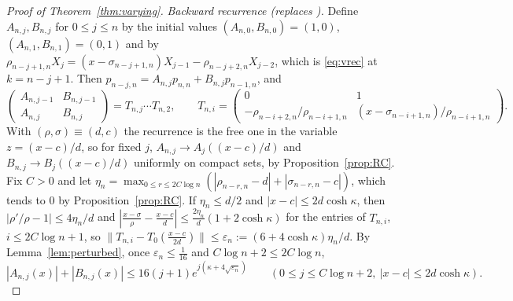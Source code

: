 \documentclass[11pt]{amsart}
\theoremstyle{definition}
\theoremstyle{remark}
\numberwithin{equation}{section}
\newcommand{\eps}{\varepsilon}
\begin{document}
\begin{proof}[Proof of Theorem~\ref{thm:varying}]
\emph{Backward recurrence (replaces \cite[Lemmas~{\ref{M-lem:continuant}}--{\ref{M-lem:transfer}}]{Main}).} Define $A_{n,j},B_{n,j}$ for $0\le j\le n$ by the initial values $(A_{n,0},B_{n,0})=(1,0)$, $(A_{n,1},B_{n,1})=(0,1)$ and by $\rho_{n-j+1,n}X_j=(x-\sigma_{n-j+1,n})X_{j-1}-\rho_{n-j+2,n}X_{j-2}$, which is \eqref{eq:vrec} at $k=n-j+1$. Then $p_{n-j,n}=A_{n,j}p_{n,n}+B_{n,j}p_{n-1,n}$, and
\[
\begin{pmatrix}A_{n,j-1}&B_{n,j-1}\\A_{n,j}&B_{n,j}\end{pmatrix}=T_{n,j}\cdots T_{n,2},\qquad T_{n,i}=\begin{pmatrix}0&1\\-\rho_{n-i+2,n}/\rho_{n-i+1,n}&(x-\sigma_{n-i+1,n})/\rho_{n-i+1,n}\end{pmatrix}.
\] With $(\rho,\sigma)\equiv(d,c)$ the recurrence is the free one in the variable $z=(x-c)/d$, so for fixed $j$, $A_{n,j}\to A_j((x-c)/d)$ and $B_{n,j}\to B_j((x-c)/d)$ uniformly on compact sets, by Proposition~\ref{prop:RC}. Fix $C>0$ and let $\eta_n=\max_{0\le r\le 2C\log n}(|\rho_{n-r,n}-d|+|\sigma_{n-r,n}-c|)$, which tends to $0$ by Proposition~\ref{prop:RC}. If $\eta_n\le d/2$ and $|x-c|\le2d\cosh\kappa$, then $|\rho'/\rho-1|\le4\eta_n/d$ and $|\frac{x-\sigma}\rho-\frac{x-c}d|\le\frac{2\eta_n}d(1+2\cosh\kappa)$ for the entries of $T_{n,i}$, $i\le2C\log n+1$, so $\|T_{n,i}-T_0(\frac{x-c}{2d})\|\le\eps_n:=(6+4\cosh\kappa)\eta_n/d$. By Lemma~\ref{lem:perturbed}, once $\eps_n\le\frac1{16}$ and $C\log n+2\le2C\log n$,
\begin{equation}\label{eq:vtransfer}
|A_{n,j}(x)|+|B_{n,j}(x)|\le16(j+1)e^{j(\kappa+4\sqrt{\eps_n})}\qquad(0\le j\le C\log n+2,\ |x-c|\le2d\cosh\kappa).
\end{equation}


\end{proof}
\end{document}
